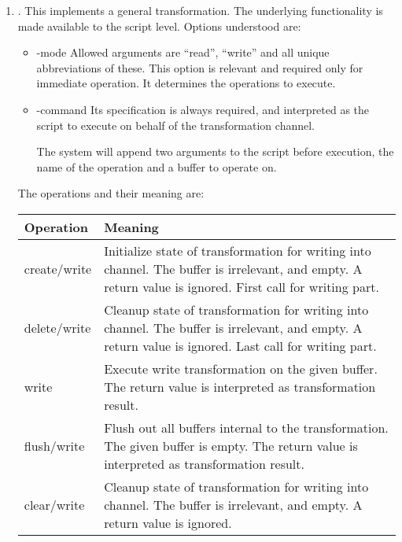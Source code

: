 \documentclass {report}
\begin{document}
\begin	{enumerate}
\item	{}. This implements a general transformation.
	The underlying functionality is made available to the script
	level. Options understood are:

	\begin	{itemize}
	\item[-mode]	Allowed arguments are ``read'', ``write'' and
			all unique abbreviations of these. This option
			is relevant and required only for immediate
			operation. It determines the operations to
			execute.

	\item[-command]	Its specification is always required, and
			interpreted as the script to execute on behalf
			of the transformation channel.

			The system will append two arguments to the
			script before execution, the name of the
			operation and a buffer to operate on.
	\end	{itemize}

	The operations and their meaning are:
	\begin {center}
	\begin {tabular}{l|p{8cm}}
	Operation	& Meaning					\\ \hline
	create/write	& Initialize state of transformation for
			  writing into channel. The buffer is
			  irrelevant, and empty. A return value is
			  ignored. First call for writing part. 	\\
	delete/write	& Cleanup state of transformation for
			  writing into channel. The buffer is
			  irrelevant, and empty. A return value is
			  ignored. Last call for writing part.		\\
	write		& Execute write transformation on the given
			  buffer. The return value is interpreted as
			  transformation result.			\\
	flush/write	& Flush out all buffers internal to the
			  transformation. The given buffer is
			  empty. The return value is interpreted as
			  transformation result.			\\
	clear/write	& Cleanup state of transformation for
			  writing into channel. The buffer is
			  irrelevant, and empty. A return value is
			  ignored.					\\ \hline


\end{tabular}
\end{center}
\end{enumerate}
\end{document}
